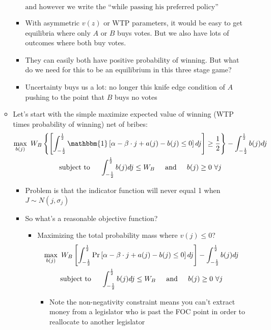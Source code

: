 \documentclass[12pt]{article}
\begin{document}
\begin{enumerate}
\begin{itemize}
\begin{itemize}
\[							\text{and however we write the ``while passing his preferred policy'' constraint}
						\]
					\item With asymmetric $v(z)$ or WTP parameters, it would be easy to get equilibria where only $A$ or $B$ buys votes. But we also have lots of outcomes where both buy votes.
					\item They can easily both have positive probability of winning. But what do we need for this to be an equilibrium in this three stage game?
					\item Uncertainty buys us a lot: no longer this knife edge condition of $A$ pushing to the point that $B$ buys no votes
				\end{itemize}
			\item Let's start with the simple maximize expected value of winning (WTP times probability of winning) net of bribes:
						\begin{multline}
							\max_{b(j)} \ W_B\left\{ \left[ \int_{-\frac{1}{2}}^\frac{1}{2} \mathbbm{1}\left[\alpha -\beta \cdot j + a(j) - b(j) \leq 0 \right] dj \right]\geq \frac{1}{2} \right\} - \int_{-\frac{1}{2}}^\frac{1}{2} b(j) dj \\
							\text{subject to} \hskip.2in \int_{-\frac{1}{2}}^\frac{1}{2} b(j) dj \leq W_B \hskip.2in \text{and} \hskip.2in b(j)\geq0 \ \forall j
						\end{multline}
				\begin{itemize}
					\item Problem is that the indicator function will never equal 1 when $J \sim N(j,\sigma_j)$
					\item So what's a reasonable objective function? 
						\begin{itemize}
							\item Maximizing the total probability mass where $v(j) \leq 0$?
							  \begin{multline}
									\max_{b(j)} \ W_B \left[ \int_{-\frac{1}{2}}^\frac{1}{2} \Pr \left[\alpha -\beta \cdot j + a(j) - b(j) \leq 0 \right] dj \right] - \int_{-\frac{1}{2}}^\frac{1}{2} b(j) dj \\
									\text{subject to} \hskip.2in \int_{-\frac{1}{2}}^\frac{1}{2} b(j) dj \leq W_B  \hskip.2in \text{and} \hskip.2in b(j)\geq0 \ \forall j
								\end{multline}
									\begin{itemize}
										\item Note the non-negativity constraint means you can't extract money from a legislator who is past the FOC point in order to reallocate to another legislator

\end{itemize}
\end{itemize}
\end{itemize}
\end{itemize}
\end{enumerate}
\end{document}

